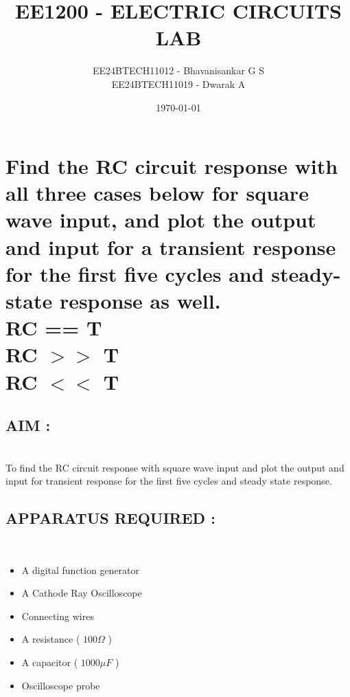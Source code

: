 \documentclass[12pt]{article}
\title{\textbf{EE1200 - ELECTRIC CIRCUITS LAB}}
\author{EE24BTECH11012 - Bhavanisankar G S \\ EE24BTECH11019 - Dwarak A}
\date{\today}
\begin{document}
\maketitle
\thispagestyle{empty} %

\newpage

\section{Find the RC circuit response with all three cases below for square wave input, and plot the output and input for a transient response for the first five cycles and steady-state response as well. \\
	RC == T \\ RC $>>$ T \\ RC $<<$ T}

\subsection{\textbf{AIM :}} \\
To find the RC circuit response with square wave input and plot the output and input for transient response for the first five cycles and steady state response.

\subsection{\textbf{APPARATUS REQUIRED :}} \\
\begin{itemize}
\item A digital function generator
\item A Cathode Ray Oscilloscope
\item Connecting wires
\item A resistance ( $100 \Omega$ )
\item A capacitor ( $1000 \mu F$ )
\item Oscilloscope probe
\end{itemize}
\end{document}
